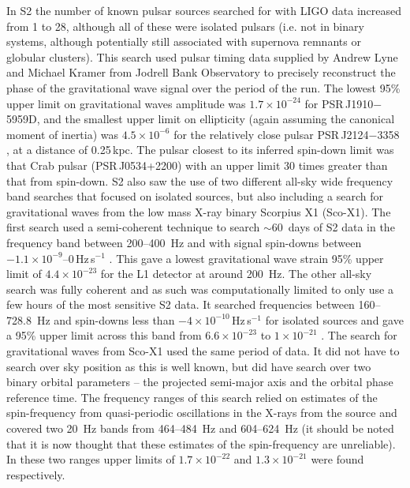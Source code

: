\documentclass{article}
\begin{document}
In S2 the number of known pulsar sources searched for with LIGO data increased
from 1 to 28, although all of these were isolated pulsars (i.e. not in binary
systems, although potentially still associated with supernova remnants or
globular clusters). This search used pulsar timing data supplied by Andrew Lyne
and Michael Kramer from Jodrell Bank Observatory to precisely reconstruct the
phase of the gravitational wave signal over the period of the run. The lowest
95\% upper limit on gravitational waves amplitude was $1.7\times10^{-24}$ for
PSR\,J1910$-$5959D, and the smallest upper limit on ellipticity (again assuming
the canonical moment of inertia) was $4.5\times10^{-6}$ for the relatively close
pulsar PSR\,J2124$-$3358 \cite{Abbott:2005f}, at a distance of 0.25\,kpc. The
pulsar closest to its inferred spin-down limit was that Crab pulsar
(PSR\,J0534+2200) with an upper limit 30 times greater than that from spin-down.
S2 also saw the use of two different all-sky wide frequency band searches that
focused on isolated sources, but also including a search for gravitational waves
from the low mass X-ray binary Scorpius X1 (Sco-X1). The first search used a
semi-coherent technique to search $\sim60$~days of S2 data in the frequency band
between 200--400~Hz and with signal spin-downs between
$-1.1\times10^{-9}$--0\,Hz\,s$^{-1}$ \cite{Abbott:2005g}. This gave a lowest
gravitational wave strain 95\% upper limit of $4.4\times10^{-23}$ for the L1
detector at around 200~Hz. The other all-sky search was fully coherent and as
such was computationally limited to only use a few hours of the most sensitive
S2 data. It searched frequencies between 160--728.8~Hz and spin-downs less than
$-4\times10^{-10}$\,Hz\,s$^{-1}$ for isolated sources and gave a 95\% upper
limit across this band from $6.6\times10^{-23}$ to $1\times10^{-21}$
\cite{Abbott:2007a}. The search for gravitational waves from Sco-X1 used the
same period of data. It did not have to search over sky position as this is well
known, but did have search over two binary orbital parameters -- the projected
semi-major axis and the orbital phase reference time. The frequency ranges of
this search relied on estimates of the spin-frequency from quasi-periodic
oscillations in the X-rays from the source and covered two 20~Hz bands from
464--484~Hz and 604--624~Hz (it should be noted that it is now thought that
these estimates of the spin-frequency are unreliable). In
these two ranges upper limits of $1.7\times10^{-22}$ and $1.3\times10^{-21}$
were found respectively.
\end{document}
